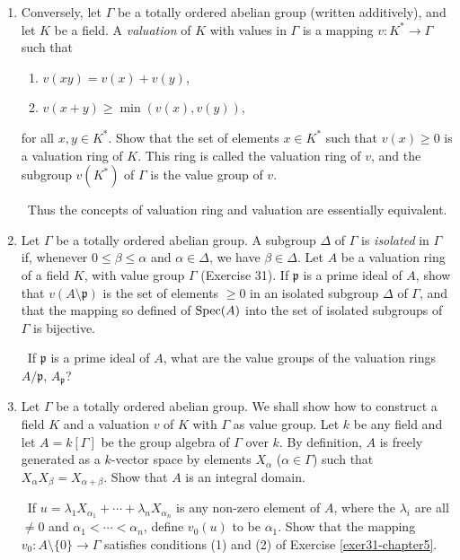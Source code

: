 \begin{enumerate}
    \item \label{exer31-chapter5}Conversely, let $\Gamma$ be a totally ordered abelian group (written additively), and let $K$ be a field. A \emph{valuation} of $K$ with values in $\Gamma$ is a mapping $v \colon K^* \to \Gamma$ such that
    \begin{enumerate}
        \item[(1)] $v(xy) = v(x) + v(y)$,
        \item[(2)] $v(x + y) \geq \min(v(x), v(y))$,
    \end{enumerate}
    for all $x, y \in K^*$. Show that the set of elements $x \in K^*$ such that $v(x) \geq 0$ is a valuation ring of $K$. This ring is called the valuation ring of $v$, and the subgroup $v(K^*)$ of $\Gamma$ is the value group of $v$.

    \quad\, Thus the concepts of valuation ring and valuation are essentially equivalent.

    \item \label{exer32-chapter5}Let $\Gamma$ be a totally ordered abelian group. A subgroup $\Delta$ of $\Gamma$ is \emph{isolated} in $\Gamma$ if, whenever $0 \leq \beta \leq \alpha$ and $\alpha \in \Delta$, we have $\beta \in \Delta$. Let $A$ be a valuation ring of a field $K$, with value group $\Gamma$ (Exercise 31). If $\mathfrak{p}$ is a prime ideal of $A$, show that $v(A \setminus \mathfrak{p})$ is the set of elements $\geq 0$ in an isolated subgroup $\Delta$ of $\Gamma$, and that the mapping so defined of $\operatorname{Spec}(A)$ into the set of isolated subgroups of $\Gamma$ is bijective.
    
    \quad\, If $\mathfrak{p}$ is a prime ideal of $A$, what are the value groups of the valuation rings $A/\mathfrak{p}$, $A_{\mathfrak{p}}$?

    \item \label{exer33-chapter5}Let $\Gamma$ be a totally ordered abelian group. We shall show how to construct a field $K$ and a valuation $v$ of $K$ with $\Gamma$ as value group. Let $k$ be any field and let $A = k[\Gamma]$ be the group algebra of $\Gamma$ over $k$. By definition, $A$ is freely generated as a $k$-vector space by elements $X_{\alpha}$ ($\alpha \in \Gamma$) such that $X_{\alpha}X_{\beta} = X_{\alpha+\beta}$. Show that $A$ is an integral domain.
    
    \quad\, If $u = \lambda_1 X_{\alpha_1} + \cdots + \lambda_n X_{\alpha_n}$ is any non-zero element of $A$, where the $\lambda_i$ are all $\neq 0$ and $\alpha_1 < \cdots < \alpha_n$, define $v_0(u)$ to be $\alpha_1$. Show that the mapping $v_0 \colon A \setminus \{0\} \to \Gamma$ satisfies conditions (1) and (2) of Exercise \ref{exer31-chapter5}.


\end{enumerate}
